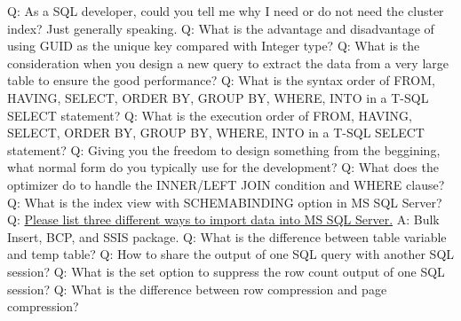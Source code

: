 \documentclass[a4paper,11pt]{article}
\begin{document}
\noindent 
Q: As a SQL developer, could you tell me why I need or do not need the cluster index? Just generally speaking.\newline \newline
\noindent 
Q: What is the advantage and disadvantage of using GUID as the unique key compared with Integer type? \newline \newline
\noindent 
Q: What is the consideration when you design a new query to extract the data from a very large table to ensure the good performance? \newline \newline
\noindent 
Q: What is the syntax order of FROM, HAVING, SELECT, ORDER BY, GROUP BY, WHERE, INTO in a T-SQL SELECT statement? \newline \newline
\noindent 
Q: What is the execution order of FROM, HAVING, SELECT, ORDER BY, GROUP BY, WHERE, INTO in a T-SQL SELECT statement? \newline \newline
\noindent 
Q: Giving you the freedom to design something from the beggining, what normal form do you typically use for the development? \newline \newline
\noindent 
Q: What does the optimizer do to handle the INNER/LEFT JOIN condition and WHERE clause? \newline \newline
\noindent 
Q: What is the index view with SCHEMABINDING option in MS SQL Server? \newline \newline
\noindent 
Q: \underline{Please list three different ways to import data into MS SQL Server.} \newline
A: Bulk Insert, BCP, and SSIS package.\newline\newline
\noindent 
Q: What is the difference between table variable and temp table? \newline \newline
\noindent 
Q: How to share the output of one SQL query with another SQL session? \newline \newline
\noindent 
Q: What is the set option to suppress the row count output of one SQL session? \newline \newline
\noindent 
Q: What is the difference between row compression and page compression? \newline \newline
\end{document}
